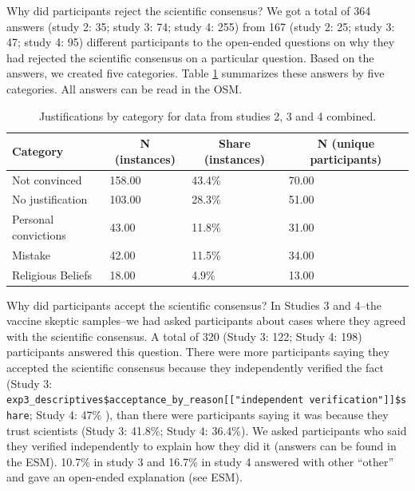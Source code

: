 \documentclass[
  doc,floatsintext]{apa6}
\begin{document}
Why did participants reject the scientific consensus? We got a total of 364 answers (study 2: 35; study 3: 74; study 4: 255) from 167 (study 2: 25; study 3: 47; study 4: 95) different participants to the open-ended questions on why they had rejected the scientific consensus on a particular question. Based on the answers, we created five categories. Table \ref{tab:justifications} summarizes these answers by five categories. All answers can be read in the OSM.

\begin{table}[tbp]

\begin{center}
\begin{threeparttable}

\caption{\label{tab:justifications}Justifications by category for data from studies 2, 3 and 4 combined.}

\begin{tabular}{llll}
\toprule
Category & \multicolumn{1}{c}{N (instances)} & \multicolumn{1}{c}{Share (instances)} & \multicolumn{1}{c}{N (unique participants)}\\
\midrule
Not convinced & 158.00 & 43.4\% & 70.00\\
No justification & 103.00 & 28.3\% & 51.00\\
Personal convictions & 43.00 & 11.8\% & 31.00\\
Mistake & 42.00 & 11.5\% & 34.00\\
Religious Beliefs & 18.00 & 4.9\% & 13.00\\
\bottomrule
\end{tabular}

\end{threeparttable}
\end{center}

\end{table}

Why did participants accept the scientific consensus? In Studies 3 and 4--the vaccine skeptic samples--we had asked participants about cases where they agreed with the scientific consensus. A total of 320 (Study 3: 122; Study 4: 198) participants answered this question. There were more participants saying they accepted the scientific consensus because they independently verified the fact (Study 3: \texttt{exp3\_descriptives\$acceptance\_by\_reason{[}{[}"independent\ verification"{]}{]}\$share}; Study 4: 47\% ), than there were participants saying it was because they trust scientists (Study 3: 41.8\%; Study 4: 36.4\%). We asked participants who said they verified independently to explain how they did it (answers can be found in the ESM). 10.7\% in study 3 and 16.7\% in study 4 answered with other ``other'' and gave an open-ended explanation (see ESM).
\end{document}
